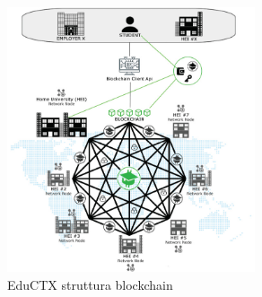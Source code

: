 \begin{figure}[h]
    \centering
    \includegraphics[width=0.65\textwidth]{Immagini/EduCTX_blockchain_structure.jpg}
    \caption{EduCTX struttura blockchain}
\end{figure}

